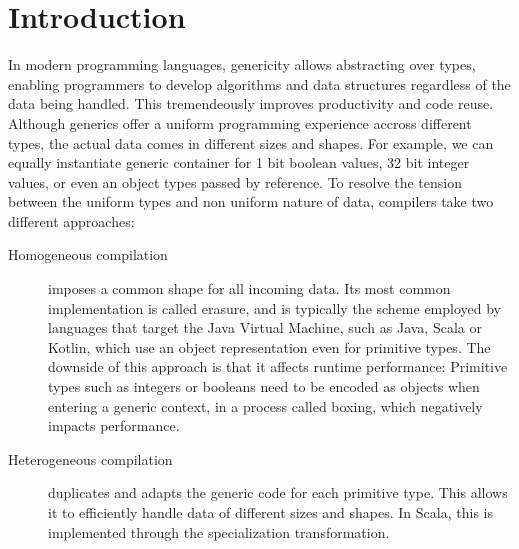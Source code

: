 \section{Introduction}
\label{sec:intro}


In modern programming languages, genericity allows abstracting over types, enabling programmers to develop algorithms and data structures regardless of the data being handled. This tremendeously improves productivity and code reuse. Although generics offer a uniform programming experience accross different types, the actual data comes in different sizes and shapes. For example, we can equally instantiate generic container for 1 bit boolean values, 32 bit integer values, or even an object types passed by reference. To resolve the tension between the uniform types and non uniform nature of data, compilers take two different approaches:

\begin{description}
  \item[Homogeneous compilation] imposes a common shape for all incoming data. Its most common implementation is called erasure, and is typically the scheme employed by languages that target the Java Virtual Machine, such as Java, Scala or Kotlin, which use an object representation even for primitive types. The downside of this approach is that it affects runtime performance: Primitive types such as integers or booleans need to be encoded as objects when entering a generic context, in a process called boxing, which negatively impacts performance.
  \item[Heterogeneous compilation] duplicates and adapts the generic code for each primitive type. This allows it to efficiently handle data of different sizes and shapes. In Scala, this is implemented through the specialization transformation. 
\end{description} 

